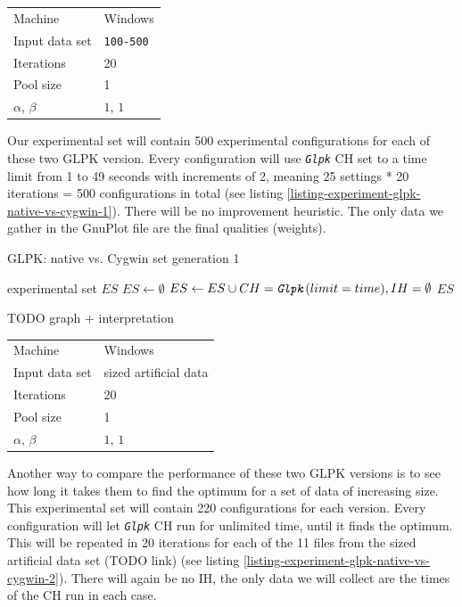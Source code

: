 \documentclass[a4paper,12pt,oneside]{report}
\newcommand{\jmodule}[1]{\texttt{\textit{#1}}}
\theoremstyle{definition}
\begin{document}
\begin{tabular}{| l | l |}
  \hline
  \hline
  Machine           & Windows \\
  Input data set    & \texttt{100-500} \\
  Iterations        & 20 \\
  Pool size         & 1 \\
  $\alpha$, $\beta$ & $1$, $1$ \\
  \hline
\end{tabular}

Our experimental set will contain 500 experimental configurations for each of these two GLPK version. Every configuration will use \jmodule{Glpk} CH set to a time limit from 1 to 49 seconds with increments of 2, meaning 25 settings * 20 iterations = 500 configurations in total (see listing \ref{listing-experiment-glpk-native-vs-cygwin-1}). There will be no improvement heuristic. The only data we gather in the GnuPlot file are the final qualities (weights).

\begin{algorithm}
\caption{GLPK: native vs. Cygwin set generation 1}
\label{listing-experiment-glpk-native-vs-cygwin-1}
\begin{algorithmic}
\ENSURE experimental set $ES$
\STATE $ES \gets \emptyset$
    \STATE $ES \gets ES \cup {CH = \jmodule{Glpk}(limit = time), IH = \emptyset}$  
  \ENDFOR
\ENDFOR
\RETURN $ES$
\end{algorithmic}
\end{algorithm}

TODO graph + interpretation

\begin{tabular}{| l | l |}
  \hline
  \hline
  Machine           & Windows \\
  Input data set    & sized artificial data \\
  Iterations        & 20 \\
  Pool size         & 1 \\
  $\alpha$, $\beta$ & $1$, $1$ \\
  \hline
\end{tabular}

Another way to compare the performance of these two GLPK versions is to see how long it takes them to find the optimum for a set of data of increasing size. This experimental set will contain 220 configurations for each version. Every configuration will let \jmodule{Glpk} CH run for unlimited time, until it finds the optimum. This will be repeated in 20 iterations for each of the 11 files from the sized artificial data set (TODO link) (see listing \ref{listing-experiment-glpk-native-vs-cygwin-2}). There will again be no IH, the only data we will collect are the times of the CH run in each case.
\end{document}
